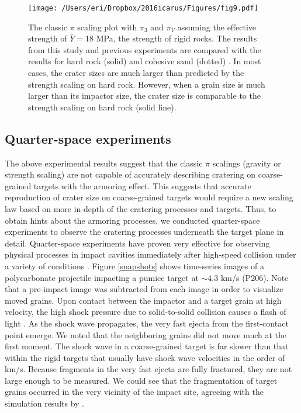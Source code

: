 \documentclass[3p,authoryear]{elsarticle}
\begin{document}
\begin{figure}[htpb]
	\centering
	\texttt{[image: /Users/eri/Dropbox/2016icarus/Figures/fig9.pdf]}
	\caption{The classic $\pi$ scaling plot with $\pi_3$ and $\pi_V$ assuming the effective strength of $\bar{Y}=18$ MPa, the strength of rigid rocks. The results from this study and previous experiments \citep{schmidt1980,mizutani1983,cintala1999,yamamoto2006,guettler2012,holsapple2014} are compared with the results for hard rock (solid) and cohesive sand (dotted) \citep{schmidt1987}. In most cases, the crater sizes are much larger than predicted by the strength scaling on hard rock. However, when a grain size is much larger than its impactor size, the crater size is comparable to the strength scaling on hard rock (solid line).}
	\label{pi3-scaling}
	\centering
\end{figure}

\subsection{Quarter-space experiments}\label{sec:observation}

The above experimental results suggest that the classic $\pi$ scalings (gravity or strength scaling) are not capable of accurately describing cratering on coarse-grained targets with the armoring effect. This suggests that accurate reproduction of crater size on coarse-grained targets would require a new scaling law based on more in-depth of the cratering processes and targets.
Thus, to obtain hints about the armoring processes, we conducted quarter-space experiments to observe the cratering processes underneath the target plane in detail.
Quarter-space experiments have proven very effective for observing physical processes in impact cavities immediately after high-speed collision under a variety of conditions \citep[e.g.][]{pietukowski1980,schultz2015}. Figure \ref{snapshots} shows time-series images of a polycarbonate projectile impacting a pumice target at $\sim 4.3$ km/s (P206).
Note that a pre-impact image was subtracted from each image in order to visualize moved grains. Upon contact between the impactor and a target grain at high velocity, the high shock pressure due to solid-to-solid collision causes a flash of light \citep[e.g.][]{sugita1998}. As the shock wave propagates, the very fast ejecta from the first-contact point emerge. We noted that the neighboring grains did not move much at the first moment. The shock wave in a coarse-grained target is far slower than that within the rigid targets that usually have shock wave velocities in the order of km/s. Because fragments in the very fast ejecta are fully fractured, they are not large enough to be measured. We could see that the fragmentation of target grains occurred in the very vicinity of the impact site, agreeing with the simulation results by \citet{barnouin2002}.
\end{document}
